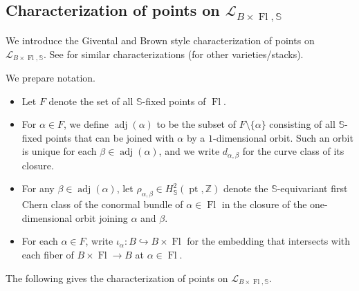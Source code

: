 \documentclass[a4paper,12pt]{amsart}
\numberwithin{equation}{section}
\theoremstyle{definition}
\newcommand{\Z}{\mathbb{Z}}
\newcommand{\bbS}{\mathbb{S}}
\newcommand{\cL}{\mathcal{L}}
\newcommand{\adj}{\operatorname{adj}}
\newcommand{\pt}{\operatorname{pt}}
\newcommand{\FlG}{\operatorname{Fl}}
\begin{document}
\subsection{Characterization of points on $\cL_{B\times\FlG,\bbS}$}
We introduce the Givental and Brown style characterization of points on $\cL_{B\times\FlG,\bbS}$.
See \cite{Brown,CCIT:mirror,JTY,FL,Koto:mirror} for similar characterizations (for other varieties/stacks).

We prepare notation.
\begin{itemize}
    \item 
    Let $F$ denote the set of all $\bbS$-fixed points of $\FlG$.
    \item 
    For $\alpha\in F$, we define $\adj(\alpha)$ to be the subset of $F\setminus\{\alpha\}$ consisting of all $\bbS$-fixed points that can be joined with $\alpha$ by a $1$-dimensional orbit.
    Such an orbit is unique for each $\beta\in\adj(\alpha)$, and we write $d_{\alpha,\beta}$ for the curve class of its closure.
    \item 
    For any $\beta\in\adj(\alpha)$, let $\rho_{\alpha,\beta}\in H^2_\bbS(\pt,\Z)$ denote the $\bbS$-equivariant first Chern class of the conormal bundle of $\alpha\in\FlG$ in the closure of the one-dimensional orbit joining $\alpha$ and $\beta$.
    \item 
    For each $\alpha\in F$, write $\iota_\alpha\colon B\hookrightarrow B\times\FlG$ for the embedding that intersects with each fiber of $B\times\FlG\to B$ at $\alpha\in\FlG$.
\end{itemize}

The following gives the characterization of points on $\cL_{B\times\FlG,\bbS}$.
\end{document}
